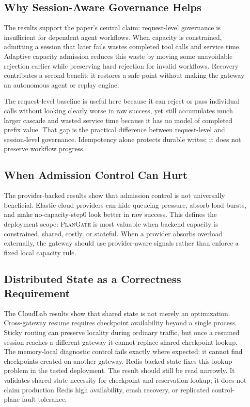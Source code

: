 \documentclass[5p,times]{elsarticle}
\newcommand{\plangate}{\textsc{PlanGate}\xspace}
\begin{document}
\subsection{Why Session-Aware Governance Helps}

The results support the paper's central claim: request-level governance is insufficient for dependent agent workflows. When capacity is constrained, admitting a session that later fails wastes completed tool calls and service time. Adaptive capacity admission reduces this waste by moving some unavoidable rejection earlier while preserving hard rejection for invalid workflows. Recovery contributes a second benefit: it restores a safe point without making the gateway an autonomous agent or replay engine.

The request-level baseline is useful here because it can reject or pass individual calls without looking clearly worse in raw success, yet still accumulates much larger cascade and wasted service time because it has no model of completed prefix value. That gap is the practical difference between request-level and session-level governance.
Idempotency alone protects durable writes; it does not preserve workflow progress.

\subsection{When Admission Control Can Hurt}

The provider-backed results show that admission control is not universally beneficial. Elastic cloud providers can hide queueing pressure, absorb load bursts, and make no-capacity-step0 look better in raw success. This defines the deployment scope: \plangate is most valuable when backend capacity is constrained, shared, costly, or stateful. When a provider absorbs overload externally, the gateway should use provider-aware signals rather than enforce a fixed local capacity rule.

\subsection{Distributed State as a Correctness Requirement}

The CloudLab results show that shared state is not merely an optimization. Cross-gateway resume requires checkpoint availability beyond a single process. Sticky routing can preserve locality during ordinary traffic, but once a resumed session reaches a different gateway it cannot replace shared checkpoint lookup. The memory-local diagnostic control fails exactly where expected: it cannot find checkpoints created on another gateway. Redis-backed state fixes this lookup problem in the tested deployment. The result should still be read narrowly. It validates shared-state necessity for checkpoint and reservation lookup; it does not claim production Redis high availability, crash recovery, or replicated control-plane fault tolerance.
\end{document}
